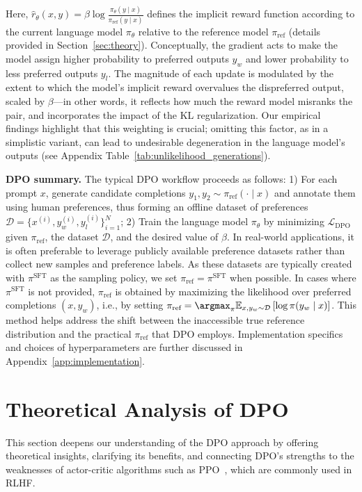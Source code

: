 Here, $\hat{r}_\theta(x, y) = \beta \log \frac{\pi_\theta(y \mid x)}{\pi_\text{ref}(y \mid x)}$ defines the implicit reward function according to the current language model $\pi_\theta$ relative to the reference model $\pi_\text{ref}$ (details provided in Section~\ref{sec:theory}). Conceptually, the gradient acts to make the model assign higher probability to preferred outputs $y_w$ and lower probability to less preferred outputs $y_l$. The magnitude of each update is modulated by the extent to which the model's implicit reward overvalues the dispreferred output, scaled by $\beta$—in other words, it reflects how much the reward model misranks the pair, and incorporates the impact of the KL regularization. Our empirical findings highlight that this weighting is crucial; omitting this factor, as in a simplistic variant, can lead to undesirable degeneration in the language model's outputs (see Appendix Table~\ref{tab:unlikelihood_generations}).

\textbf{DPO summary.} The typical DPO workflow proceeds as follows: 1) For each prompt $x$, generate candidate completions $y_1, y_2 \sim \pi_\text{ref}(\cdot \mid x)$ and annotate them using human preferences, thus forming an offline dataset of preferences $\mathcal{D} = \{x^{(i)}, y_w^{(i)}, y_l^{(i)}\}_{i=1}^N$; 2) Train the language model $\pi_\theta$ by minimizing $\mathcal{L}_\text{DPO}$ given $\pi_\text{ref}$, the dataset $\mathcal{D}$, and the desired value of $\beta$.  
In real-world applications, it is often preferable to leverage publicly available preference datasets rather than collect new samples and preference labels. As these datasets are typically created with $\pi^\text{SFT}$ as the sampling policy, we set $\pi_\text{ref} = \pi^\text{SFT}$ when possible. In cases where $\pi^\text{SFT}$ is not provided, $\pi_\text{ref}$ is obtained by maximizing the likelihood over preferred completions ${(x, y_w)}$, i.e., by setting ${\pi_\text{ref} = \argmax_{\pi}\mathbb{E}_{x, y_w \sim \mathcal{D}}\left[\log \pi(y_w \mid x)\right]}$. This method helps address the shift between the inaccessible true reference distribution and the practical $\pi_\text{ref}$ that DPO employs. Implementation specifics and choices of hyperparameters are further discussed in Appendix~\ref{app:implementation}.

\section{Theoretical Analysis of DPO} This section deepens our understanding of the DPO approach by offering theoretical insights, clarifying its benefits, and connecting DPO’s strengths to the weaknesses of actor-critic algorithms such as PPO~\cite{schulman2017proximal}, which are commonly used in RLHF.


